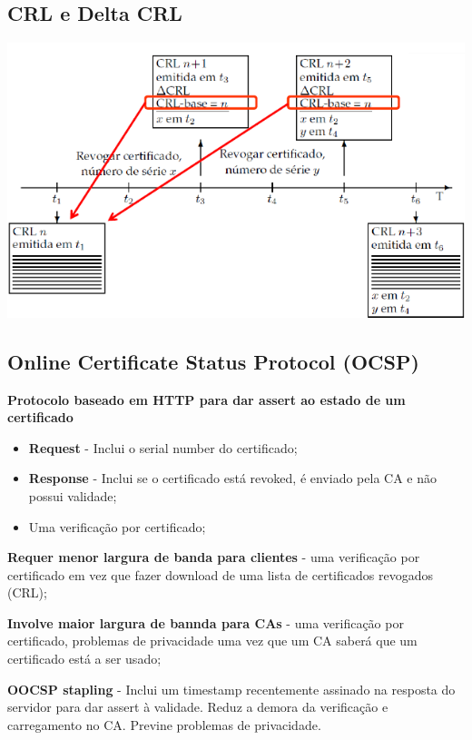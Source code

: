 \documentclass{article}
\begin{document}
\subsection{CRL e Delta CRL}

\begin{center}
  \includegraphics[scale=0.55]{17}
\end{center}

\pagebreak

\subsection{Online Certificate Status Protocol (OCSP)}

\begin{flushleft}
  \textbf{Protocolo baseado em HTTP para dar assert ao estado de um certificado}
  \begin{itemize}
    \item \textbf{Request} - Inclui o serial number do certificado;
    \item \textbf{Response} - Inclui se o certificado está revoked,
    é enviado pela CA e não possui validade;
    \item Uma verificação por certificado;
  \end{itemize}

  \vspace{2mm}

  \textbf{Requer menor largura de banda para clientes} -
  uma verificação por certificado em vez que fazer
  download de uma lista de certificados revogados (CRL);

  \vspace{2mm}

  \textbf{Involve maior largura de bannda para CAs} -
  uma verificação por certificado, problemas de privacidade
  uma vez que um CA saberá que um certificado está a ser usado;
  
  \vspace{2mm}

  \textbf{OOCSP stapling} - Inclui um timestamp recentemente assinado
  na resposta do servidor para dar assert à validade. Reduz a demora
  da verificação e carregamento no CA. Previne problemas de privacidade.
\end{flushleft}
\end{document}
